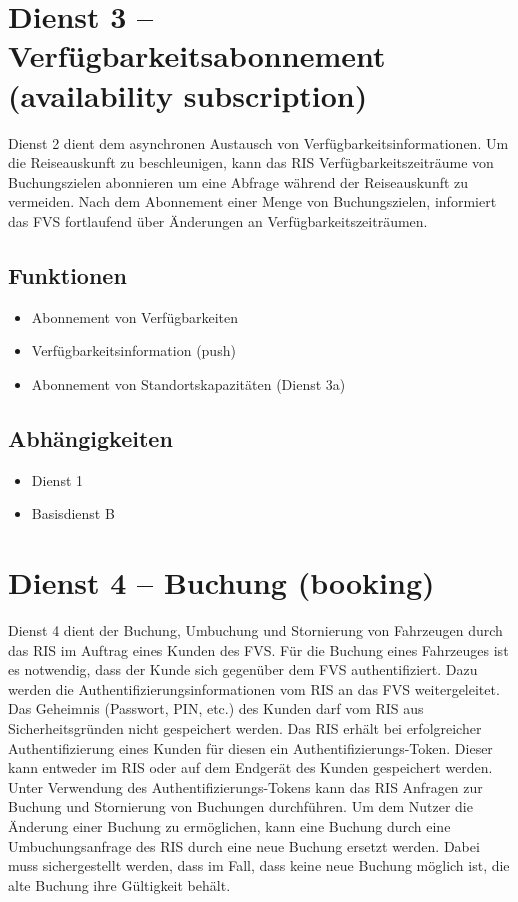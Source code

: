 \section{Dienst 3 -- Verfügbarkeitsabonnement (availability subscription) }
\label{sec:Hierachiemodell:Dienst3}
Dienst 2 dient dem asynchronen Austausch von Verfügbarkeitsinformationen. Um die Reiseauskunft zu beschleunigen, kann das RIS Verfügbarkeitszeiträume von Buchungszielen abonnieren um eine Abfrage während der Reiseauskunft zu vermeiden. Nach dem Abonnement einer Menge von Buchungszielen, informiert das FVS fortlaufend über Änderungen an Verfügbarkeitszeiträumen.

\subsection*{Funktionen}
\begin{itemize}
\item Abonnement von Verfügbarkeiten
\item Verfügbarkeitsinformation (push)
\item Abonnement von Standortskapazitäten (Dienst 3a)
\end{itemize}

\subsection*{Abhängigkeiten}
\begin{itemize}
\item Dienst 1
\item Basisdienst B
\end{itemize}


\section{Dienst 4 -- Buchung (booking)}
\label{sec:Hierachiemodell:Dienst4}
Dienst 4 dient der Buchung, Umbuchung und Stornierung von Fahrzeugen durch das RIS im Auftrag eines Kunden des FVS. Für die Buchung eines Fahrzeuges ist es notwendig, dass der Kunde sich gegenüber dem FVS authentifiziert. Dazu werden die Authentifizierungsinformationen vom RIS an das FVS weitergeleitet. Das Geheimnis (Passwort, PIN, etc.) des Kunden darf vom RIS aus Sicherheitsgründen nicht gespeichert werden. Das RIS erhält bei erfolgreicher Authentifizierung eines Kunden für diesen ein Authentifizierungs-Token. Dieser kann entweder im RIS oder auf dem Endgerät des Kunden gespeichert werden. Unter Verwendung des Authentifizierungs-Tokens kann das RIS Anfragen zur Buchung und Stornierung von Buchungen durchführen.  Um dem Nutzer die Änderung einer Buchung zu ermöglichen, kann eine Buchung durch eine Umbuchungsanfrage des RIS durch eine neue Buchung ersetzt werden. Dabei muss sichergestellt werden, dass im Fall, dass keine neue Buchung möglich ist, die alte Buchung ihre Gültigkeit behält.


